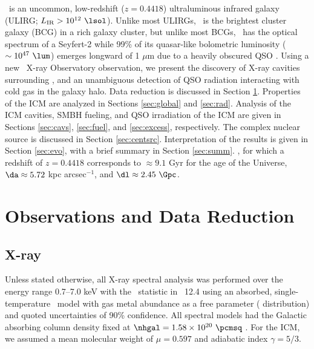 \documentclass[useAMS,usenatbib]{mn2e}
\begin{document}
\irs\ is an uncommon, low-redshift ($z = 0.4418$) ultraluminous
infrared galaxy (ULIRG; $L_{\mathrm{IR}} > 10^{12} ~\lsol$). Unlike
most ULIRGs, \irs\ is the brightest cluster galaxy (BCG) in a rich
galaxy cluster, but unlike most BCGs, \irs\ has the optical spectrum
of a Seyfert-2 while 99\% of its quasar-like bolometric luminosity
($\sim 10^{47} ~\lum$) emerges longward of 1 $\mu$m due to a heavily
obscured QSO \citep[][see also Section
  \ref{sec:centsrc}]{1988ApJ...328..161K, 1993ApJ...415...82H,
  1994ApJ...436L..51F, 1998ApJ...506..205E, 2000A&A...353..910F,
  2001MNRAS.321L..15I}. Using a new \chandra\ X-ray Observatory
observation, we present the discovery of X-ray cavities surrounding
\irs, and an unambiguous detection of QSO radiation interacting with
cold gas in the galaxy halo. Data reduction is discussed in Section
\ref{sec:obs}. Properties of the ICM are analyzed in Sections
\ref{sec:global} and \ref{sec:rad}. Analysis of the ICM cavities, SMBH
fueling, and QSO irradiation of the ICM are given in Sections
\ref{sec:cavs}, \ref{sec:fuel}, and \ref{sec:excess},
respectively. The complex nuclear source is discussed in Section
\ref{sec:centsrc}. Interpretation of the results is given in Section
\ref{sec:evo}, with a brief summary in Section \ref{sec:summ}. \LCDM,
for which a redshift of $z = 0.4418$ corresponds to $\approx 9.1$ Gyr
for the age of the Universe, $\da \approx 5.72$ kpc arcsec$^{-1}$, and
$\dl \approx 2.45~\Gpc$.

\section{Observations and Data Reduction}
\label{sec:obs}

\subsection{X-ray}
\label{sec:xray}

Unless stated otherwise, all X-ray spectral analysis was performed
over the energy range 0.7--7.0 keV with the \chisq\ statistic in
\xspec\ 12.4 \citep{xspec} using an absorbed, single-temperature
\mekal\ model \citep{mekal1} with gas metal abundance as a free
parameter (\citealt{ag89} distribution) and quoted uncertainties of
90\% confidence. All spectral models had the Galactic absorbing column
density fixed at $\nhgal = 1.58 \times 10^{20} ~\pcmsq$
\citep{lab}. For the ICM, we assumed a mean molecular weight of $\mu =
0.597$ and adiabatic index $\gamma = 5/3$.
\end{document}
